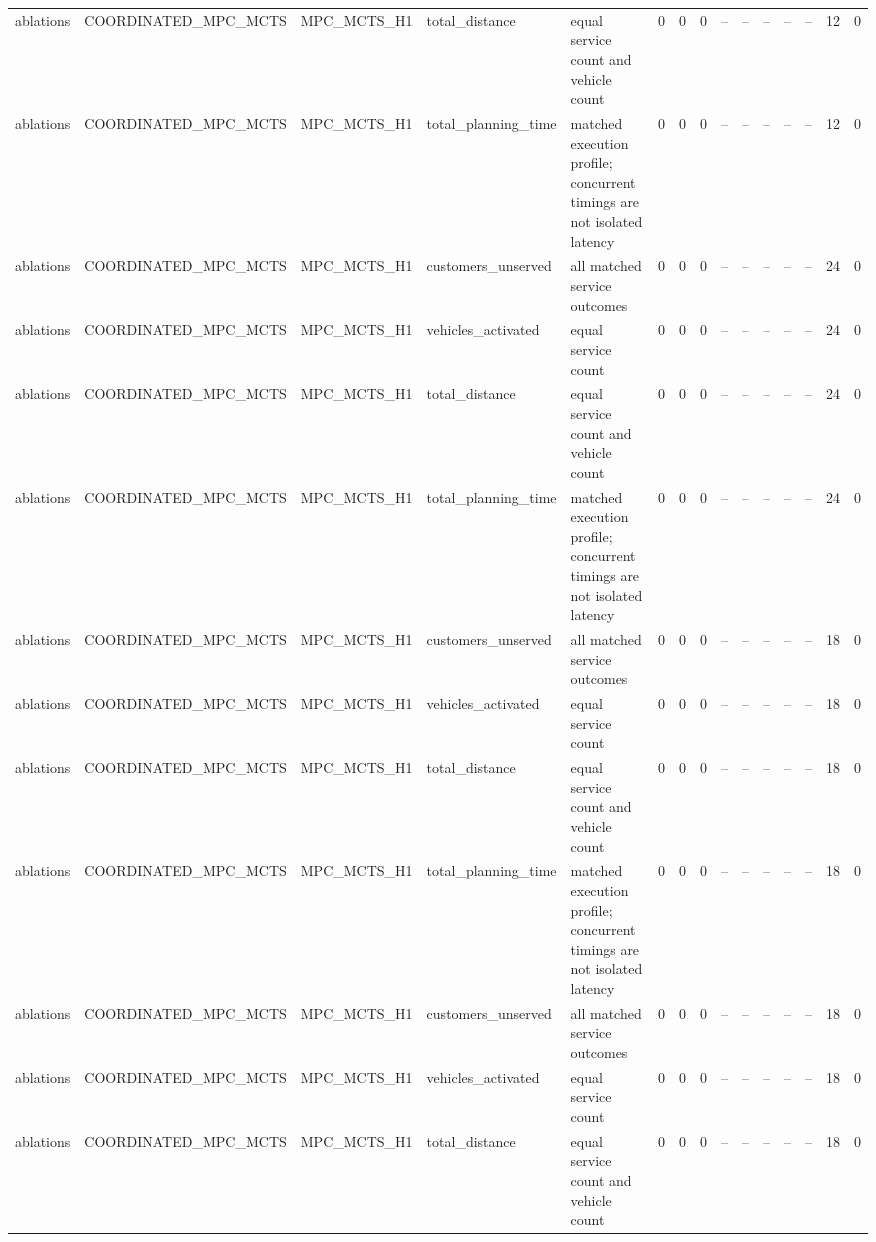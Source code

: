 \begin{table}
{\begin{tabular}{lllllrrrrrrrrrr}
ablations & COORDINATED\_MPC\_MCTS & MPC\_MCTS\_H1 & total\_distance & equal service count and vehicle count & 0 & 0 & 0 & -- & -- & -- & -- & -- & 12 & 0 \\
ablations & COORDINATED\_MPC\_MCTS & MPC\_MCTS\_H1 & total\_planning\_time & matched execution profile; concurrent timings are not isolated latency & 0 & 0 & 0 & -- & -- & -- & -- & -- & 12 & 0 \\
ablations & COORDINATED\_MPC\_MCTS & MPC\_MCTS\_H1 & customers\_unserved & all matched service outcomes & 0 & 0 & 0 & -- & -- & -- & -- & -- & 24 & 0 \\
ablations & COORDINATED\_MPC\_MCTS & MPC\_MCTS\_H1 & vehicles\_activated & equal service count & 0 & 0 & 0 & -- & -- & -- & -- & -- & 24 & 0 \\
ablations & COORDINATED\_MPC\_MCTS & MPC\_MCTS\_H1 & total\_distance & equal service count and vehicle count & 0 & 0 & 0 & -- & -- & -- & -- & -- & 24 & 0 \\
ablations & COORDINATED\_MPC\_MCTS & MPC\_MCTS\_H1 & total\_planning\_time & matched execution profile; concurrent timings are not isolated latency & 0 & 0 & 0 & -- & -- & -- & -- & -- & 24 & 0 \\
ablations & COORDINATED\_MPC\_MCTS & MPC\_MCTS\_H1 & customers\_unserved & all matched service outcomes & 0 & 0 & 0 & -- & -- & -- & -- & -- & 18 & 0 \\
ablations & COORDINATED\_MPC\_MCTS & MPC\_MCTS\_H1 & vehicles\_activated & equal service count & 0 & 0 & 0 & -- & -- & -- & -- & -- & 18 & 0 \\
ablations & COORDINATED\_MPC\_MCTS & MPC\_MCTS\_H1 & total\_distance & equal service count and vehicle count & 0 & 0 & 0 & -- & -- & -- & -- & -- & 18 & 0 \\
ablations & COORDINATED\_MPC\_MCTS & MPC\_MCTS\_H1 & total\_planning\_time & matched execution profile; concurrent timings are not isolated latency & 0 & 0 & 0 & -- & -- & -- & -- & -- & 18 & 0 \\
ablations & COORDINATED\_MPC\_MCTS & MPC\_MCTS\_H1 & customers\_unserved & all matched service outcomes & 0 & 0 & 0 & -- & -- & -- & -- & -- & 18 & 0 \\
ablations & COORDINATED\_MPC\_MCTS & MPC\_MCTS\_H1 & vehicles\_activated & equal service count & 0 & 0 & 0 & -- & -- & -- & -- & -- & 18 & 0 \\
ablations & COORDINATED\_MPC\_MCTS & MPC\_MCTS\_H1 & total\_distance & equal service count and vehicle count & 0 & 0 & 0 & -- & -- & -- & -- & -- & 18 & 0 \\

\end{tabular}}
\end{table}
